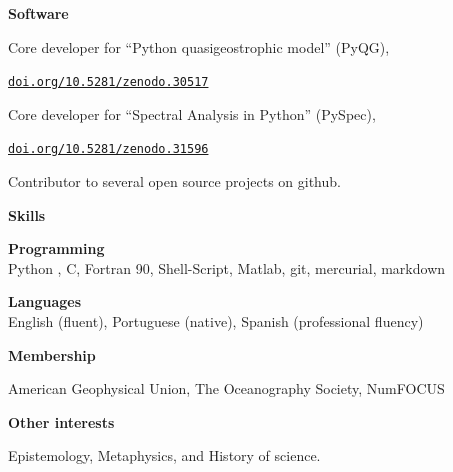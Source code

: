 \documentclass[a4paper,11pt,final]{memoir}
\newcommand{\Sep}{\vspace{1.25em}}
\newcommand{\SmallSep}{\vspace{0.5em}}
\newcommand{\CVSection}[1]
    {\Large\textbf{#1}\par
    \SmallSep\normalsize\normalfont}
\newcommand{\CVItem}[1]
    {\textbf{\color{NavyBlue} #1}}
\begin{document}
\Sep

%
%

\CVSection{Software}

Core developer for ``Python quasigeostrophic model'' (PyQG),

\href{http://dx.doi.org/10.5281/zenodo.30517}{\texttt{doi.org/10.5281/zenodo.30517}}

\SmallSep

Core developer for ``Spectral Analysis in Python'' (PySpec),

\SmallSep

\href{http://dx.doi.org/10.5281/zenodo.31596}{\texttt{doi.org/10.5281/zenodo.31596}}

\SmallSep

Contributor to several open source projects on github.

\Sep


\Sep

\CVSection{Skills}

\CVItem{Programming}\\
Python , C, Fortran 90, Shell-Script, Matlab, git, mercurial, markdown

\SmallSep

\CVItem{Languages}\\
English (fluent), Portuguese (native), Spanish (professional fluency)

\Sep

\CVSection{Membership}

 American Geophysical Union, The Oceanography Society, NumFOCUS

\Sep

\CVSection{Other interests}

Epistemology, Metaphysics, and History of science.

%
%
%
%
%
%
%
%
\end{document}
